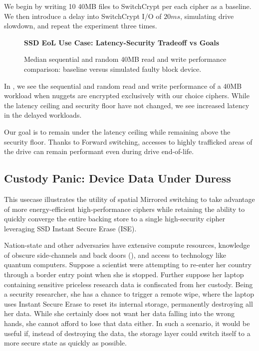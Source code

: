 We begin by writing 10 40MB files to SwitchCrypt per each cipher as a baseline.
We then introduce a delay into SwitchCrypt I/O of $20ms$, simulating drive
slowdown, and repeat the experiment three times.

\begin{figure}[ht] \textbf{SSD EoL Use Case: Latency-Security Tradeoff vs
   Goals}\par\medskip
   {} \caption{Median sequential and
   random 40MB read and write performance comparison: baseline versus simulated
   faulty block device.}
  \label{fig:usecase-eol-tradeoff}
\end{figure}

In , we see the sequential and random read and
write performance of a 40MB workload when nuggets are encrypted exclusively with
our choice ciphers. While the latency ceiling and security floor have not
changed, we see increased latency in the delayed workloads.

Our goal is to remain under the latency ceiling while remaining above the
security floor. Thanks to Forward switching, accesses to highly trafficked areas
of the drive can remain performant even during drive end-of-life.

\subsection{Custody Panic: Device Data Under Duress} \label{subsec:uc4}

This usecase illustrates the utility of spatial Mirrored switching to take
advantage of more energy-efficient high-performance ciphers while retaining the
ability to quickly converge the entire backing store to a single high-security
cipher leveraging SSD Instant Secure Erase (ISE).

Nation-state and other adversaries have extensive compute resources, knowledge
of obscure side-channels and back doors (),
and access to technology like quantum computers. Suppose a scientist were
attempting to re-enter her country through a border entry point when she is
stopped. Further suppose her laptop containing sensitive priceless research data
is confiscated from her custody. Being a security researcher, she has a chance
to trigger a remote wipe, where the laptop uses Instant Secure Erase to reset
its internal storage, permanently destroying all her data. While she certainly
does not want her data falling into the wrong hands, she cannot afford to lose
that data either. In such a scenario, it would be useful if, instead of
destroying the data, the storage layer could switch itself to a more secure
state as quickly as possible.

